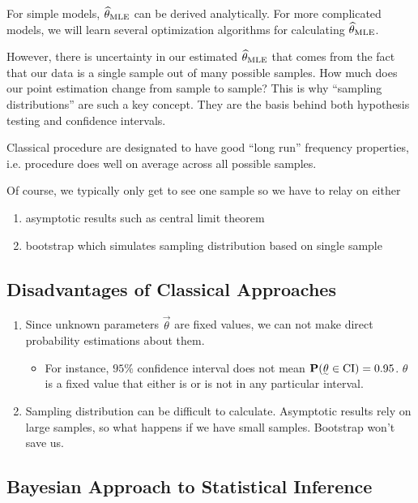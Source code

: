 For simple models, $\widehat{\theta}_{{\text{MLE}}}$ can be derived analytically. For more complicated models, we will learn several optimization algorithms for calculating $\widehat{\theta}_{\text{MLE}}$.

However, there is uncertainty in our estimated $\widehat{\theta}_{\text{MLE}}$ that comes from the fact that our data is a single sample out of many possible samples. How much does our point estimation change from sample to sample? This is why ``sampling distributions'' are such a key concept. They are the basis behind both hypothesis testing and confidence intervals.

Classical procedure are designated to have good ``long run'' frequency properties, i.e. procedure does well on average across all possible samples.

Of course, we typically only get to see one sample so we have to relay on either
\begin{enumerate}
    \item asymptotic results such as central limit theorem
    \item bootstrap which simulates sampling distribution based on single sample
\end{enumerate}

\subsection{Disadvantages of Classical Approaches}
\begin{enumerate}
    \item Since unknown parameters $\vec{\theta}$ are fixed values, we can not make direct probability estimations about them.
    \begin{itemize}
        \item For instance, $95\%$ confidence interval does not mean $\P(\vec{\theta} \in \text{CI}) = 0.95$. $\theta$ is a fixed value that either is or is not in any particular interval.
    \end{itemize}
    \item Sampling distribution can be difficult to calculate. Asymptotic results rely on large samples, so what happens if we have small samples. Bootstrap won't save us.
\end{enumerate}

\subsection{Bayesian Approach to Statistical Inference}

